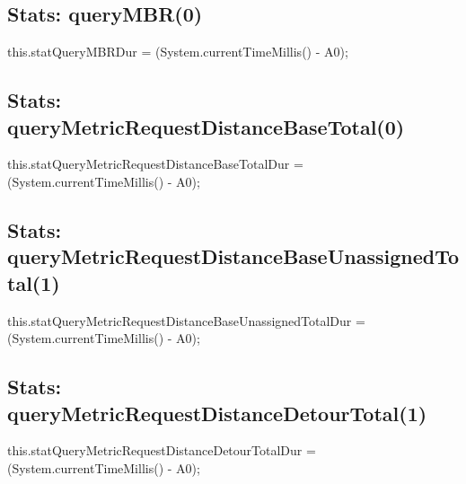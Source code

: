 \subsection{Stats: queryMBR(0)}
\nwenddocs{}\endmoddef{}
this.statQueryMBRDur = (System.currentTimeMillis() - A0);
\nwendcode{}\nwdocspar

\subsection{Stats: queryMetricRequestDistanceBaseTotal(0)}
\nwenddocs{}\endmoddef{}
this.statQueryMetricRequestDistanceBaseTotalDur = (System.currentTimeMillis() - A0);
\nwendcode{}\nwdocspar

\subsection{Stats: queryMetricRequestDistanceBaseUnassignedTotal(1)}
\nwenddocs{}\endmoddef{}
this.statQueryMetricRequestDistanceBaseUnassignedTotalDur = (System.currentTimeMillis() - A0);
\nwendcode{}\nwdocspar

\subsection{Stats: queryMetricRequestDistanceDetourTotal(1)}
\nwenddocs{}\endmoddef{}
this.statQueryMetricRequestDistanceDetourTotalDur = (System.currentTimeMillis() - A0);
\nwendcode{}\nwdocspar


